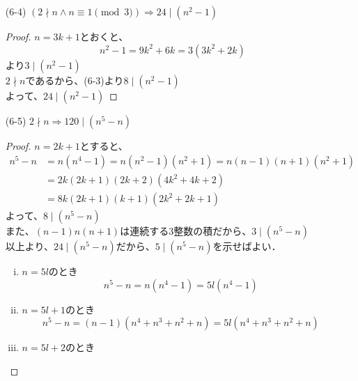 \documentclass[a4paper,12pt]{ltjsarticle}
\begin{document}
\begin{enumerate}[(1)]
\begin{proof}
\begin{enumerate}[(i)]
\begin{equation*}
                        k^2 + k = 4l^2 + 6l + 2 = 2(2l^2 + 3l + 1)
                    \end{equation*}
            \end{enumerate}
        \end{proof}
    \item[(6-4)] $(2 \nmid n \land n \equiv 1 \pmod 3) \Rightarrow 24 \mid (n^2 - 1)$
        \begin{proof}
            $n = 3k + 1$とおくと、
            \begin{equation*}
                n^2 - 1 = 9k^2 + 6k = 3(3k^2 + 2k)
            \end{equation*}
            より$3 \mid (n^2 - 1)$ \\
            $2 \nmid n$であるから、(6-3)より$8 \mid (n^2 - 1)$ \\
            よって、$24 \mid (n^2 - 1)$
        \end{proof}
    \item[(6-5)] $2 \nmid n \Rightarrow 120 \mid (n^5 - n)$
        \begin{proof}
            $n = 2k + 1$とすると、
            \begin{align*}
                n^5 - n &= n(n^4 - 1) = n(n^2 - 1)(n^2 + 1) = n(n - 1)(n + 1)(n^2 + 1) \\
                &= 2k(2k + 1)(2k + 2)(4k^2 + 4k + 2) \\
                &= 8k(2k + 1)(k + 1)(2k^2 + 2k + 1)
            \end{align*}
            よって、$8 \mid (n^5 - n)$ \\
            また、$(n - 1)n(n + 1)$は連続する3整数の積だから、$3 \mid (n^5 - n)$ \\
            以上より、$24 \mid (n^5 - n)$だから、$5 \mid (n^5 - n)$を示せばよい．
            \begin{enumerate}[(i)]
                \item $n = 5l$のとき
                    \begin{equation*}
                        n^5 - n = n(n^4 - 1) = 5l(n^4 - 1)
                    \end{equation*}
                \item $n = 5l + 1$のとき
                    \begin{equation*}
                        n^5 - n = (n - 1)(n^4 + n^3 + n^2 + n) = 5l(n^4 + n^3 + n^2 + n)
                    \end{equation*}
                \item $n = 5l + 2$のとき

\end{enumerate}
\end{proof}
\end{enumerate}
\end{document}
